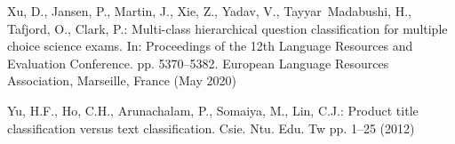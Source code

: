 \documentclass[runningheads, envcountsame, a4paper]{llncs}
\begin{document}
\begin{thebibliography}{10}
Xu, D., Jansen, P., Martin, J., Xie, Z., Yadav, V., Tayyar~Madabushi, H.,
  Tafjord, O., Clark, P.: Multi-class hierarchical question classification for
  multiple choice science exams. In: Proceedings of the 12th Language Resources
  and Evaluation Conference. pp. 5370--5382. European Language Resources
  Association, Marseille, France (May 2020)

Yu, H.F., Ho, C.H., Arunachalam, P., Somaiya, M., Lin, C.J.: Product title
  classification versus text classification. Csie. Ntu. Edu. Tw pp. 1--25
  (2012)

\end{thebibliography}
\end{document}

